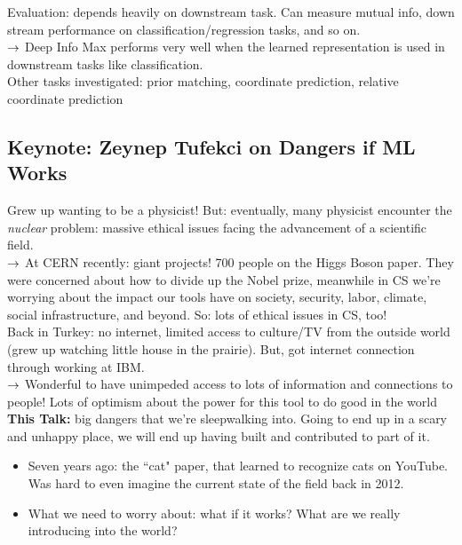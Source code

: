 Evaluation: depends heavily on downstream task. Can measure mutual info, down stream performance on classification/regression tasks, and so on. \\

$\rightarrow$ Deep Info Max performs very well when the learned representation is used in downstream tasks like classification. \\

Other tasks investigated: prior matching, coordinate prediction, relative coordinate prediction \\


\subsection{Keynote: Zeynep Tufekci on Dangers if ML Works}

Grew up wanting to be a physicist! But: eventually, many physicist encounter the {\it nuclear} problem: massive ethical issues facing the advancement of a scientific field. \\

$\rightarrow$ At CERN recently: giant projects! 700 people on the Higgs Boson paper. They were concerned about how to divide up the Nobel prize, meanwhile in CS we're worrying about the impact our tools have on society, security, labor, climate, social infrastructure, and beyond. So: lots of ethical issues in CS, too! \\

Back in Turkey: no internet, limited access to culture/TV from the outside world (grew up watching little house in the prairie). But, got internet connection through working at IBM. \\

$\rightarrow$ Wonderful to have unimpeded access to lots of information and connections to people! Lots of optimism about the power for this tool to do good in the world \\


{\bf This Talk:} big dangers that we're sleepwalking into. Going to end up in a scary and unhappy place, we will end up having built and contributed to part of it. \\
\begin{itemize}
    \item Seven years ago: the ``cat" paper, that learned to recognize cats on YouTube. Was hard to even imagine the current state of the field back in 2012.
    \item What we need to worry about: what if it works? What are we really introducing into the world?
\end{itemize}


